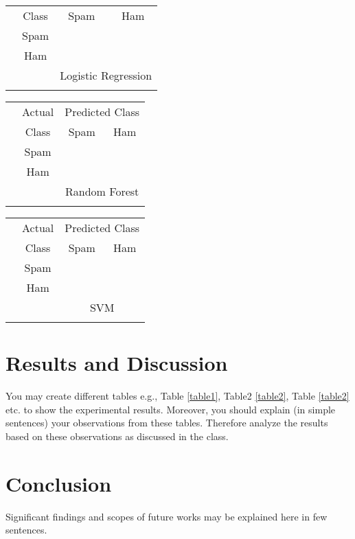 \documentclass[11pt]{article}
\begin{document}
\begin{table}
\begin{center}
\begin{tabular}{c|ccc}
\cline{3-4} 		&Class		&\multicolumn{1}{|c}{Spam}	&\multicolumn{1}{c|}{Ham}  \\
\cline{2-4} 	&Spam	&\multicolumn{1}{|c}{ }	&\multicolumn{1}{c|}{ }	\\
&Ham	&\multicolumn{1}{|c}{ }	&\multicolumn{1}{c|}{ }	\\
\cline{2-4} \multicolumn{1}{c}{}  &\multicolumn{1}{c}{ } &\multicolumn{2}{c}{Logistic Regression}    \\
\multicolumn{4}{c}{}
\end{tabular}
\begin{tabular}{c|ccc}
\cline{2-4} &Actual	&\multicolumn{2}{|c|}{Predicted Class}  \\
\cline{3-4} 		&Class		&\multicolumn{1}{|c}{Spam}	&\multicolumn{1}{c|}{Ham}  \\
\cline{2-4} 	&Spam	&\multicolumn{1}{|c}{ }	&\multicolumn{1}{c|}{ }	\\
&Ham	&\multicolumn{1}{|c}{ }	&\multicolumn{1}{c|}{ }	\\
\cline{2-4} \multicolumn{1}{c}{}  &\multicolumn{1}{c}{ } &\multicolumn{2}{c}{Random Forest}    \\
\multicolumn{4}{c}{}
\end{tabular}
\begin{tabular}{c|ccc}
\cline{2-4} &Actual	&\multicolumn{2}{|c|}{Predicted Class}  \\
\cline{3-4} 		&Class		&\multicolumn{1}{|c}{Spam}	&\multicolumn{1}{c|}{Ham}  \\
\cline{2-4} 	&Spam	&\multicolumn{1}{|c}{ }	&\multicolumn{1}{c|}{ }	\\
&Ham	&\multicolumn{1}{|c}{ }	&\multicolumn{1}{c|}{ }	\\
\cline{2-4} \multicolumn{1}{c}{}  &\multicolumn{1}{c}{ } &\multicolumn{2}{c}{SVM}    \\
\multicolumn{4}{c}{}
\end{tabular}
\end{center}
\end{table}

\section{Results and Discussion}
You may create different tables  e.g., Table \ref{table1}, Table2 \ref{table2}, Table \ref{table2} etc. to show the experimental results. Moreover, you should explain (in simple sentences) your observations from these tables. Therefore analyze the results based on these observations as discussed in the class.

\section{Conclusion}	
Significant findings and scopes of future works may be explained here in few sentences.

 


\end{document}
